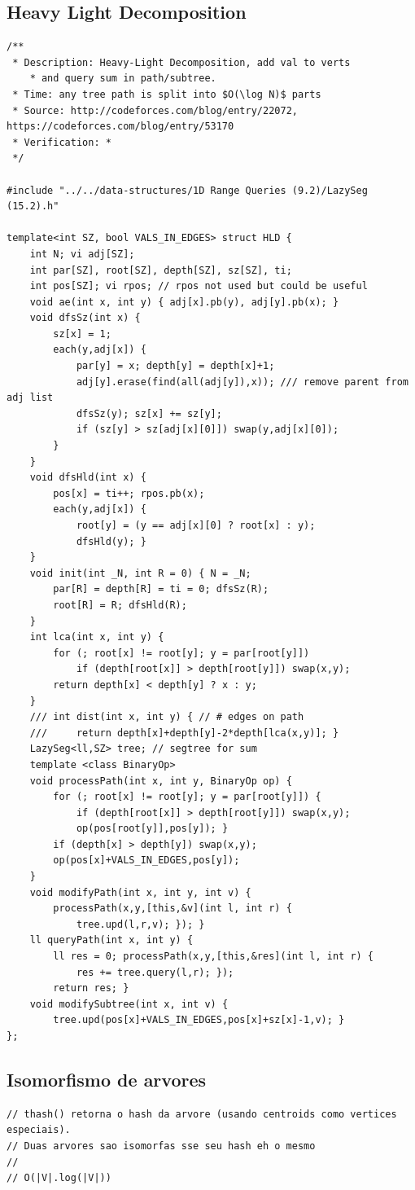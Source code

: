 \documentclass[9pt, a4paper, notitlepage]{extreport}
\begin{document}
\begin{multicols}{3}
\subsection{Heavy Light Decomposition}
\begin{verbatim}
/**
 * Description: Heavy-Light Decomposition, add val to verts 
 	* and query sum in path/subtree.
 * Time: any tree path is split into $O(\log N)$ parts
 * Source: http://codeforces.com/blog/entry/22072, https://codeforces.com/blog/entry/53170
 * Verification: *
 */

#include "../../data-structures/1D Range Queries (9.2)/LazySeg (15.2).h"

template<int SZ, bool VALS_IN_EDGES> struct HLD { 
	int N; vi adj[SZ];
	int par[SZ], root[SZ], depth[SZ], sz[SZ], ti;
	int pos[SZ]; vi rpos; // rpos not used but could be useful
	void ae(int x, int y) { adj[x].pb(y), adj[y].pb(x); }
	void dfsSz(int x) { 
		sz[x] = 1; 
		each(y,adj[x]) {
			par[y] = x; depth[y] = depth[x]+1;
			adj[y].erase(find(all(adj[y]),x)); /// remove parent from adj list
			dfsSz(y); sz[x] += sz[y];
			if (sz[y] > sz[adj[x][0]]) swap(y,adj[x][0]);
		}
	}
	void dfsHld(int x) {
		pos[x] = ti++; rpos.pb(x);
		each(y,adj[x]) {
			root[y] = (y == adj[x][0] ? root[x] : y);
			dfsHld(y); }
	}
	void init(int _N, int R = 0) { N = _N; 
		par[R] = depth[R] = ti = 0; dfsSz(R); 
		root[R] = R; dfsHld(R); 
	}
	int lca(int x, int y) {
		for (; root[x] != root[y]; y = par[root[y]])
			if (depth[root[x]] > depth[root[y]]) swap(x,y);
		return depth[x] < depth[y] ? x : y;
	}
	/// int dist(int x, int y) { // # edges on path
	/// 	return depth[x]+depth[y]-2*depth[lca(x,y)]; }
	LazySeg<ll,SZ> tree; // segtree for sum
	template <class BinaryOp>
	void processPath(int x, int y, BinaryOp op) {
		for (; root[x] != root[y]; y = par[root[y]]) {
			if (depth[root[x]] > depth[root[y]]) swap(x,y);
			op(pos[root[y]],pos[y]); }
		if (depth[x] > depth[y]) swap(x,y);
		op(pos[x]+VALS_IN_EDGES,pos[y]); 
	}
	void modifyPath(int x, int y, int v) { 
		processPath(x,y,[this,&v](int l, int r) { 
			tree.upd(l,r,v); }); }
	ll queryPath(int x, int y) { 
		ll res = 0; processPath(x,y,[this,&res](int l, int r) { 
			res += tree.query(l,r); });
		return res; }
	void modifySubtree(int x, int v) { 
		tree.upd(pos[x]+VALS_IN_EDGES,pos[x]+sz[x]-1,v); }
};
\end{verbatim}

\subsection{Isomorfismo de arvores}
\begin{verbatim}
// thash() retorna o hash da arvore (usando centroids como vertices especiais).
// Duas arvores sao isomorfas sse seu hash eh o mesmo
//
// O(|V|.log(|V|))


\end{verbatim}
\end{multicols}
\end{document}
